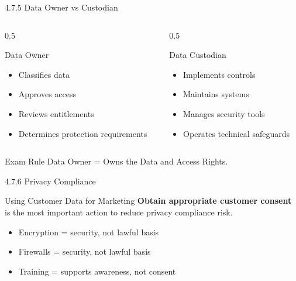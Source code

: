 \documentclass{beamer}
\begin{document}
	\begin{frame}{4.7.5 Data Owner vs Custodian}
		\begin{columns}
			\begin{column}{0.5\textwidth}
				\begin{block}{Data Owner}
					\begin{itemize}
						\item Classifies data
						\item Approves access
						\item Reviews entitlements
						\item Determines protection requirements
					\end{itemize}
				\end{block}
			\end{column}
			\begin{column}{0.5\textwidth}
				\begin{block}{Data Custodian}
					\begin{itemize}
						\item Implements controls
						\item Maintains systems
						\item Manages security tools
						\item Operates technical safeguards
					\end{itemize}
				\end{block}
			\end{column}
		\end{columns}
		\begin{exampleblock}{Exam Rule}
			Data Owner = Owns the Data and Access Rights.
		\end{exampleblock}
	\end{frame}
	
	\begin{frame}{4.7.6 Privacy Compliance}
		\begin{block}{Using Customer Data for Marketing}
			\textbf{Obtain appropriate customer consent} is the most important action to reduce privacy compliance risk.
		\end{block}
		\begin{itemize}
			\item Encryption = security, not lawful basis
			\item Firewalls = security, not lawful basis
			\item Training = supports awareness, not consent
		\end{itemize}
	\end{frame}
	
\end{document}
